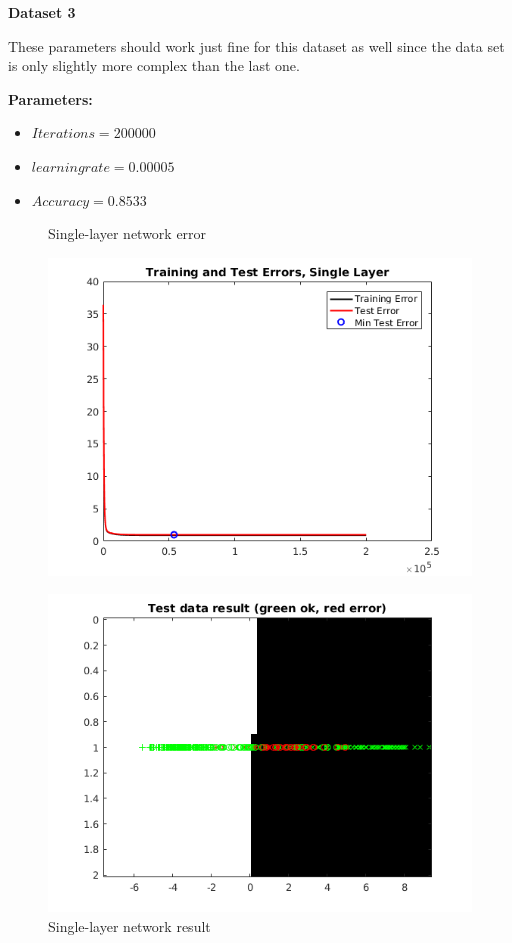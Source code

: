 \documentclass[a4paper,12pt]{article}
\begin{document}
\noindent \textbf{Dataset 3}

These parameters should work just fine for this dataset as well since the data set is only slightly more complex than the last one.

\textbf{Parameters:}
\begin{itemize}
\item $Iterations = 200000$
\item $learning rate = 0.00005$
\item $Accuracy = 0.8533$
\end{itemize}

\begin{figure}[H]
\centering
  \begin{minipage}[]{0.49\textwidth}
  \caption{Single-layer network error}\label{fig:single_3_error}
  \includegraphics[width=\textwidth]{figures/single_3_error.png}
  \end{minipage}
  \begin{minipage}[]{0.49\textwidth}
  \caption{Single-layer network result}\label{fig:single_3_test}
  \includegraphics[width=\textwidth]{figures/single_3_test.png}
  \end{minipage}
\end{figure}
\end{document}
